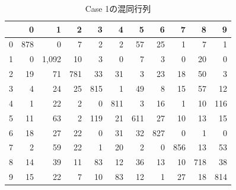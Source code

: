 \documentclass[class=jsarticle, crop=false, dvipdfmx, fleqn]{standalone}
\begin{document}
\clearpage
\begin{table}
    \centering
    \caption{Case 1の混同行列}
    \begin{tabular}{|r|rrrrrrrrrr|} \hline
        & 0 & 1 & 2 & 3 & 4 & 5 & 6 & 7 & 8 & 9 \\ \hline
        0 & 878 & 0 & 7 & 2 & 2 & 57 & 25 & 1 & 7 & 1 \\
        1 & 0 & 1,092 & 10 & 3 & 0 & 7 & 3 & 0 & 20 & 0 \\
        2 & 19 & 71 & 781 & 33 & 31 & 3 & 23 & 18 & 50 & 3 \\
        3 & 4 & 24 & 25 & 815 & 1 & 49 & 8 & 15 & 57 & 12 \\
        4 & 1 & 22 & 2 & 0 & 811 & 3 & 16 & 1 & 10 & 116 \\
        5 & 11 & 63 & 2 & 119 & 21 & 611 & 27 & 10 & 13 & 15 \\
        6 & 18 & 27 & 22 & 0 & 31 & 32 & 827 & 0 & 1 & 0 \\
        7 & 2 & 59 & 22 & 1 & 20 & 2 & 0 & 856 & 13 & 53 \\
        8 & 14 & 39 & 11 & 83 & 12 & 36 & 13 & 10 & 718 & 38 \\
        9 & 15 & 22 & 7 & 10 & 83 & 12 & 1 & 27 & 18 & 814 \\
        \hline
    \end{tabular}
    \label{tab:confusion_matrix_case1}
\end{table}
\vspace*{3\baselineskip}
\end{document}
